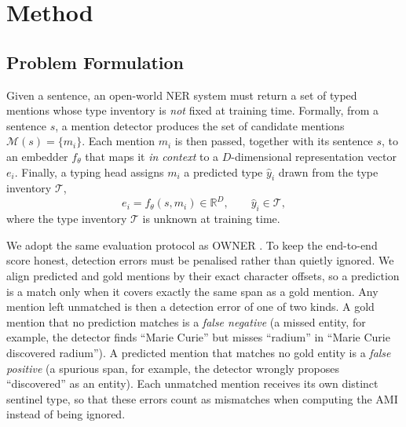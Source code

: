 \section{Method}
\label{sec:method}

\subsection{Problem Formulation}
\label{sec:method:problem}
Given a sentence, an open-world NER system must return a set of typed mentions whose type inventory is \emph{not} fixed at training time.
Formally, from a sentence $s$, a mention detector produces the set of candidate mentions $\mathcal{M}(s)=\{m_i\}$. Each mention $m_i$ is then passed, together with its sentence $s$, to an embedder $f_\theta$ that maps it \emph{in context} to a $D$-dimensional representation vector $e_i$. Finally, a typing head assigns $m_i$ a predicted type $\hat y_i$ drawn from the type inventory $\mathcal{T}$,
\begin{equation}
e_i = f_\theta(s, m_i)\in\mathbb{R}^{D},\qquad \hat y_i\in\mathcal{T},
\end{equation}
where the type inventory $\mathcal{T}$ is unknown at training time.

We adopt the same evaluation protocol as OWNER \cite{genest2025owner}.
To keep the end-to-end score honest, detection errors must be penalised rather than quietly ignored. We align predicted and gold mentions by their exact character offsets, so a prediction is a match only when it covers exactly the same span as a gold mention. Any mention left unmatched is then a detection error of one of two kinds. A gold mention that no prediction matches is a \emph{false negative} (a missed entity, for example, the detector finds ``Marie Curie'' but misses ``radium'' in ``Marie Curie discovered radium''). A predicted mention that matches no gold entity is a \emph{false positive} (a spurious span, for example, the detector wrongly proposes ``discovered'' as an entity). Each unmatched mention receives its own distinct sentinel type, so that these errors count as mismatches when computing the AMI instead of being ignored.

